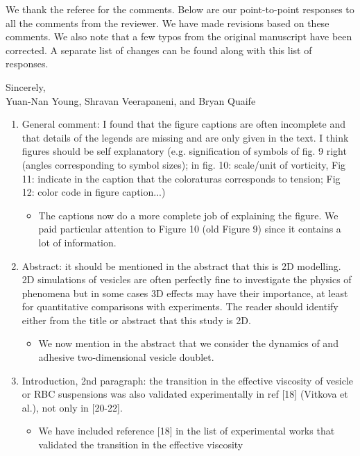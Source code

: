 \documentclass[11pt]{article}
\newcommand{\comment}[1]{{\color{blue} #1}}
\begin{document}
\noindent
We thank the referee for the comments.  Below are our point-to-point
responses to all the comments from the reviewer.  We have made revisions
based on these comments.  We also note that a few typos from the
original manuscript have been corrected.  A separate list of changes can
be found along with this list of responses.

\medskip
\noindent 
Sincerely, \\ \noindent
Yuan-Nan Young, Shravan Veerapaneni, and Bryan Quaife

\vspace{20pt}

\begin{enumerate}
\item\comment{General comment: I found that the figure captions are often
incomplete and that details of the legends are missing and are only
given in the text. I think figures should be self explanatory (e.g.
signification of symbols of fig. 9 right (angles corresponding to symbol
sizes); in fig. 10: scale/unit of vorticity, Fig 11: indicate in the
caption that the coloraturas corresponds to tension; Fig 12: color code
in figure caption...)}
\begin{itemize}
  \item The captions now do a more complete job of explaining the
    figure.  We paid particular attention to Figure 10 (old Figure 9)
    since it contains a lot of information.
\end{itemize}

\item\comment{Abstract: it should be mentioned in the abstract that this is
2D modelling. 2D simulations of vesicles are often perfectly fine to
investigate the physics of phenomena but in some cases 3D effects may
have their importance, at least for quantitative comparisons with
experiments. The reader should identify either from the title or
abstract that this study is 2D.}
\begin{itemize}
  \item We now mention in the abstract that we consider the dynamics of
    and adhesive two-dimensional vesicle doublet.
\end{itemize}

\item\comment{Introduction, 2nd paragraph: the transition in the effective
viscosity of vesicle or RBC suspensions was also validated
experimentally in ref [18] (Vitkova et al.), not only in [20-22].}
\begin{itemize}
  \item We have included reference [18] in the list of experimental
    works that validated the transition in the effective viscosity
\end{itemize}


\end{enumerate}
\end{document}
